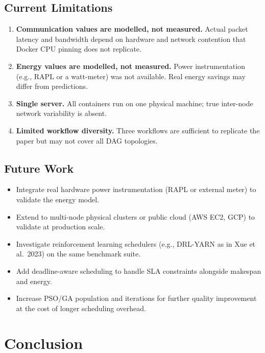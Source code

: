\documentclass[12pt,a4paper]{article}
\begin{document}
\subsection{Current Limitations}
\begin{enumerate}[leftmargin=1.5cm]
    \item \textbf{Communication values are modelled, not measured.} Actual packet latency and bandwidth depend on hardware and network contention that Docker CPU pinning does not replicate.
    \item \textbf{Energy values are modelled, not measured.} Power instrumentation (e.g., RAPL or a watt-meter) was not available. Real energy savings may differ from predictions.
    \item \textbf{Single server.} All containers run on one physical machine; true inter-node network variability is absent.
    \item \textbf{Limited workflow diversity.} Three workflows are sufficient to replicate the paper but may not cover all DAG topologies.
\end{enumerate}

\subsection{Future Work}
\begin{itemize}[leftmargin=1.5cm]
    \item Integrate real hardware power instrumentation (RAPL or external meter) to validate the energy model.
    \item Extend to multi-node physical clusters or public cloud (AWS EC2, GCP) to validate at production scale.
    \item Investigate reinforcement learning schedulers (e.g., DRL-YARN as in Xue et al.\ 2023) on the same benchmark suite.
    \item Add deadline-aware scheduling to handle SLA constraints alongside makespan and energy.
    \item Increase PSO/GA population and iterations for further quality improvement at the cost of longer scheduling overhead.
\end{itemize}

\section{Conclusion}
\end{document}
